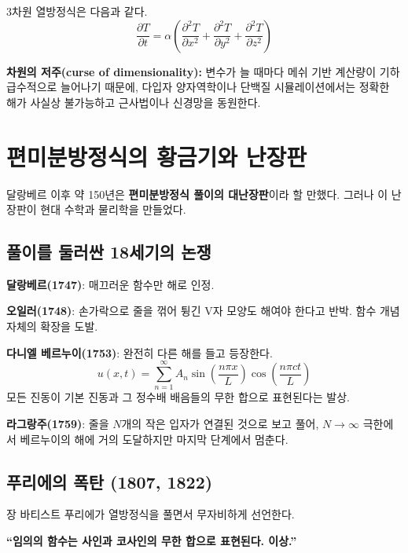 \documentclass[11pt,a4paper]{article}
\begin{document}
3차원 열방정식은 다음과 같다.
\[
\frac{\partial T}{\partial t} = \alpha \left( \frac{\partial^2 T}{\partial x^2} + \frac{\partial^2 T}{\partial y^2} + \frac{\partial^2 T}{\partial z^2} \right)
\]

\textbf{차원의 저주(curse of dimensionality):} 변수가 늘 때마다 메쉬 기반 계산량이 기하급수적으로 늘어나기 때문에, 다입자 양자역학이나 단백질 시뮬레이션에서는 정확한 해가 사실상 불가능하고 근사법이나 신경망을 동원한다.

\section{편미분방정식의 황금기와 난장판}

달랑베르 이후 약 150년은 \textbf{편미분방정식 풀이의 대난장판}이라 할 만했다. 그러나 이 난장판이 현대 수학과 물리학을 만들었다.

\subsection{풀이를 둘러싼 18세기의 논쟁}

\textbf{달랑베르(1747)}: 매끄러운 함수만 해로 인정.

\textbf{오일러(1748)}: 손가락으로 줄을 꺾어 튕긴 V자 모양도 해여야 한다고 반박. 함수 개념 자체의 확장을 도발.

\textbf{다니엘 베르누이(1753)}: 완전히 다른 해를 들고 등장한다.
\begin{equation}
u(x, t) = \sum_{n=1}^{\infty} A_n \sin\!\left(\frac{n\pi x}{L}\right) \cos\!\left(\frac{n\pi c t}{L}\right)
\end{equation}
모든 진동이 기본 진동과 그 정수배 배음들의 무한 합으로 표현된다는 발상.

\textbf{라그랑주(1759)}: 줄을 $N$개의 작은 입자가 연결된 것으로 보고 풀어, $N \to \infty$ 극한에서 베르누이의 해에 거의 도달하지만 마지막 단계에서 멈춘다.

\subsection{푸리에의 폭탄 (1807, 1822)}

장 바티스트 푸리에가 열방정식을 풀면서 무자비하게 선언한다.

\begin{quotebox}
\textbf{``임의의 함수는 사인과 코사인의 무한 합으로 표현된다. 이상.''}
\end{quotebox}
\end{document}
